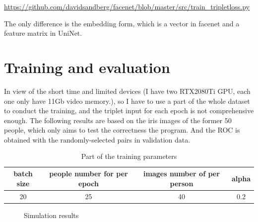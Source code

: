 \documentclass{article}
\begin{document}
\textcolor{blue}{\url{https://github.com/davidsandberg/facenet/blob/master/src/train_tripletloss.py}}

The only difference is the embedding form, which is a vector in facenet and a feature matrix in UniNet.

\section{Training and evaluation}
In view of the short time and limited devices (I have two RTX2080Ti GPU, each one only have 11Gb video memory.), so I have to use a part of the whole dataset to conduct the training, and the triplet input for each epoch is not comprehensive enough. The following results are based on the iris images of the former 50 people, which only aims to test the correctness the program. And the ROC is obtained with the randomly-selected pairs in validation data.

\begin{table}[h]
	\centering\caption{Part of the training parameters}
	\begin{tabular}{cccc}
		\toprule[1.5pt]
		batch size & people number for per epoch & images number of per person & alpha \\ \midrule[1.5pt]
		20         & 25                          & 40                          & 0.2 \\ \bottomrule[1.5pt]
	\end{tabular}
\end{table}
\begin{figure}[h]
	\centering
	\caption{Simulation results}
\end{figure}




\end{document}
